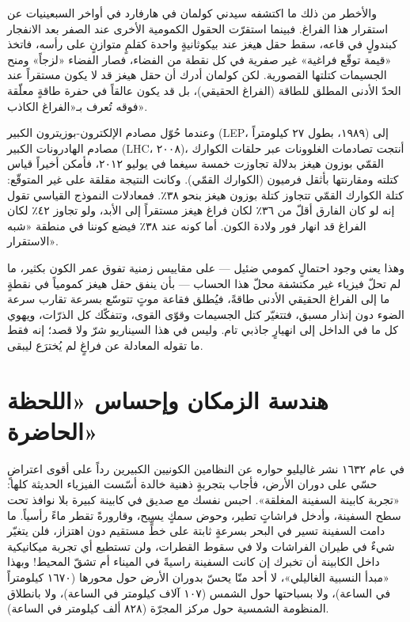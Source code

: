 \documentclass[12pt,a4paper,openany]{book}
\begin{document}
والأخطر من ذلك ما اكتشفه سيدني كولمان في هارفارد في أواخر السبعينيات عن استقرار هذا الفراغ. فبينما استقرّت الحقول الكمومية الأخرى عند الصفر بعد الانفجار كبندولٍ في قاعه، سقط حقل هيغز عند بيكوثانيةٍ واحدة كقلمٍ متوازنٍ على رأسه، فاتخذ «قيمة توقّع فراغية» غير صفرية في كل نقطة من الفضاء، فصار الفضاء «لزجاً» ومنح الجسيمات كتلتها القصورية. لكن كولمان أدرك أن حقل هيغز قد لا يكون مستقراً عند الحدّ الأدنى المطلق للطاقة (الفراغ الحقيقي)، بل قد يكون عالقاً في حفرة طاقةٍ معلّقة فوقه تُعرف بـ«الفراغ الكاذب».


وعندما حُوّل مصادم الإلكترون-بوزيترون الكبير (LEP، ١٩٨٩، بطول ٢٧ كيلومتراً) إلى مصادم الهادرونات الكبير (LHC، ٢٠٠٨)، أنتجت تصادمات الغلوونات عبر حلقات الكوارك القمّي بوزون هيغز بدلالة تجاوزت خمسة سيغما في يوليو ٢٠١٢، فأمكن أخيراً قياس كتلته ومقارنتها بأثقل فرميون (الكوارك القمّي). وكانت النتيجة مقلقة على غير المتوقّع: كتلة الكوارك القمّي تتجاوز كتلة بوزون هيغز بنحو ٣٨٪. فمعادلات النموذج القياسي تقول إنه لو كان الفارق أقلّ من ٣٦٪ لكان فراغ هيغز مستقراً إلى الأبد، ولو تجاوز ٤٢٪ لكان الفراغ قد انهار فور ولادة الكون. أما كونه عند ٣٨٪ فيضع كوننا في منطقة «شبه الاستقرار».


وهذا يعني وجود احتمالٍ كمومي ضئيل — على مقاييس زمنية تفوق عمر الكون بكثير، ما لم تحلّ فيزياء غير مكتشفة محلّ هذا الحساب — بأن ينفق حقل هيغز كمومياً في نقطةٍ ما إلى الفراغ الحقيقي الأدنى طاقةً، فيُطلق فقاعة موتٍ تتوسّع بسرعة تقارب سرعة الضوء دون إنذار مسبق، فتتغيّر كتل الجسيمات وقوّى القوى، وتتفكّك كل الذرّات، ويهوي كل ما في الداخل إلى انهيارٍ جاذبي تام. وليس في هذا السيناريو شرّ ولا قصد؛ إنه فقط ما تقوله المعادلة عن فراغٍ لم يُخترَع ليبقى.


\chapter*{هندسة الزمكان وإحساس «اللحظة الحاضرة»}




في عام ١٦٣٢ نشر غاليليو حواره عن النظامين الكونيين الكبيرين رداً على أقوى اعتراضٍ حسّي على دوران الأرض، فأجاب بتجربةٍ ذهنية خالدة أسّست الفيزياء الحديثة كلها: «تجربة كابينة السفينة المغلقة». احبس نفسك مع صديق في كابينة كبيرة بلا نوافذ تحت سطح السفينة، وأدخل فراشاتٍ تطير، وحوض سمكٍ يسبح، وقارورةً تقطر ماءً رأسياً. ما دامت السفينة تسير في البحر بسرعةٍ ثابتة على خطٍّ مستقيم دون اهتزاز، فلن يتغيّر شيءٌ في طيران الفراشات ولا في سقوط القطرات، ولن تستطيع أي تجربة ميكانيكية داخل الكابينة أن تخبرك إن كانت السفينة راسيةً في الميناء أم تشقّ المحيط! وبهذا «مبدأ النسبية الغاليلي»، لا أحد منّا يحسّ بدوران الأرض حول محورها (١٦٧٠ كيلومتراً في الساعة)، ولا بسباحتها حول الشمس (١٠٧ آلاف كيلومتر في الساعة)، ولا بانطلاق المنظومة الشمسية حول مركز المجرّة (٨٢٨ ألف كيلومتر في الساعة).
\end{document}
